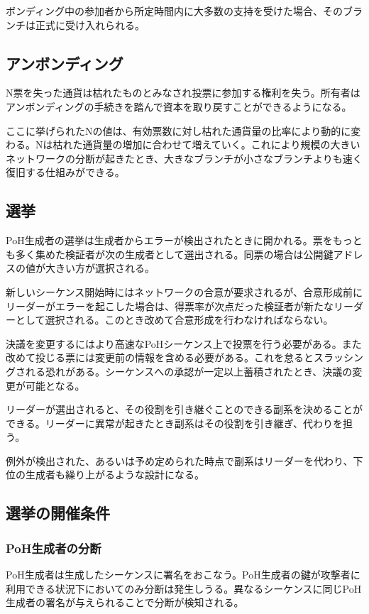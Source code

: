 \documentclass[12pt]{ltjsarticle}
\begin{document}
ボンディング中の参加者から所定時間内に大多数の支持を受けた場合、そのブランチは正式に受け入れられる。

\subsection{アンボンディング}

N票を失った通貨は枯れたものとみなされ投票に参加する権利を失う。所有者はアンボンディングの手続きを踏んで資本を取り戻すことができるようになる。

ここに挙げられたNの値は、有効票数に対し枯れた通貨量の比率により動的に変わる。Nは枯れた通貨量の増加に合わせて増えていく。これにより規模の大きいネットワークの分断が起きたとき、大きなブランチが小さなブランチよりも速く復旧する仕組みができる。

\subsection{選挙}\label{subsec:elections}
PoH生成者の選挙は生成者からエラーが検出されたときに開かれる。票をもっとも多く集めた検証者が次の生成者として選出される。同票の場合は公開鍵アドレスの値が大きい方が選択される。

新しいシーケンス開始時にはネットワークの合意が要求されるが、合意形成前にリーダーがエラーを起こした場合は、得票率が次点だった検証者が新たなリーダーとして選択される。このとき改めて合意形成を行わなければならない。

決議を変更するにはより高速なPoHシーケンス上で投票を行う必要がある。また改めて投じる票には変更前の情報を含める必要がある。これを怠るとスラッシングされる恐れがある。シーケンスへの承認が一定以上蓄積されたとき、決議の変更が可能となる。

リーダーが選出されると、その役割を引き継ぐことのできる副系を決めることができる。リーダーに異常が起きたとき副系はその役割を引き継ぎ、代わりを担う。

例外が検出された、あるいは予め定められた時点で副系はリーダーを代わり、下位の生成者も繰り上がるような設計になる。

\subsection{選挙の開催条件}
\subsubsection{PoH生成者の分断}

PoH生成者は生成したシーケンスに署名をおこなう。PoH生成者の鍵が攻撃者に利用できる状況下においてのみ分断は発生しうる。異なるシーケンスに同じPoH生成者の署名が与えられることで分断が検知される。
\end{document}
